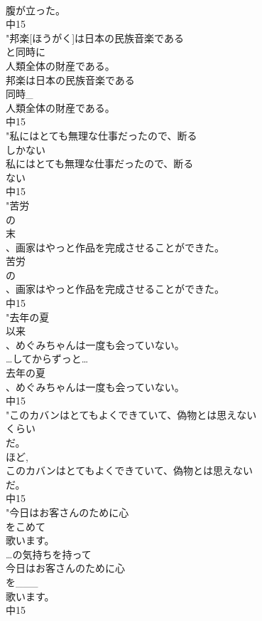 \documentclass[8pt]{extreport}
\begin{document}
\begin{CJK}{UTF8}{min}
\\	腹が立った。
\\	中15
\\	"邦楽[ほうがく]は日本の民族音楽である
\\	と同時に
\\	人類全体の財産である。
\\	邦楽は日本の民族音楽である
\\	同時_
\\	人類全体の財産である。
\\	中15
\\	"私にはとても無理な仕事だったので、断る
\\	しかない
\\	私にはとても無理な仕事だったので、断る
\\	ない
\\	中15
\\	"苦労
\\	の
\\	末
\\	、画家はやっと作品を完成させることができた。
\\	苦労
\\	の
\\	、画家はやっと作品を完成させることができた。
\\	中15
\\	"去年の夏
\\	以来
\\	、めぐみちゃんは一度も会っていない。
\\	…してからずっと… 
\\	去年の夏
\\	、めぐみちゃんは一度も会っていない。
\\	中15
\\	"このカバンはとてもよくできていて、偽物とは思えない
\\	くらい
\\	だ。
\\	ほど, 
\\	このカバンはとてもよくできていて、偽物とは思えない
\\	だ。
\\	中15
\\	"今日はお客さんのために心
\\	をこめて
\\	歌います。
\\	…の気持ちを持って
\\	今日はお客さんのために心
\\	を___
\\	歌います。
\\	中15

\end{CJK}
\end{document}
